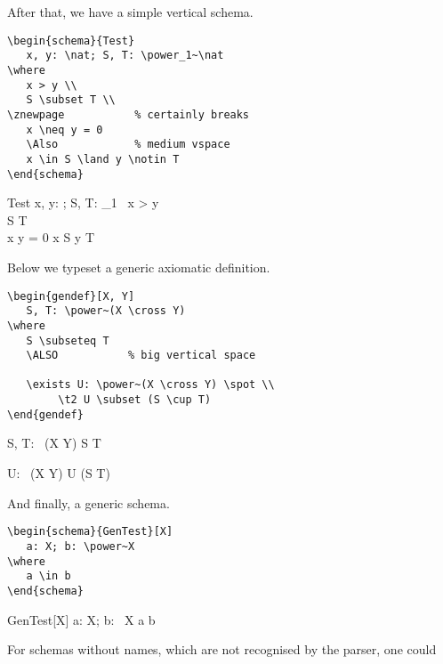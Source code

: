 \documentclass{article}
\def\gives{\endquote\endgroup\egroup}
\begin{document}
After that, we have a simple vertical schema.
%
\begin{demo}
\begin{verbatim}
\begin{schema}{Test}
   x, y: \nat; S, T: \power_1~\nat
\where
   x > y \\
   S \subset T \\
\znewpage           % certainly breaks
   x \neq y = 0
   \Also            % medium vspace
   x \in S \land y \notin T
\end{schema}
\end{verbatim}
\gives
\begin{schema}{Test}
   x, y: \nat; S, T: \power_1~\nat
\where
   x > y \\
   S \subset T \\
\znewpage           %
   x \neq y = 0
   \Also            %
   x \in S \land y \notin T
\end{schema}
\end{demo}
%
Below we typeset a generic axiomatic definition.
%
\begin{demo}
\begin{verbatim}
\begin{gendef}[X, Y]
   S, T: \power~(X \cross Y)
\where
   S \subseteq T
   \ALSO           % big vertical space

   \exists U: \power~(X \cross Y) \spot \\
        \t2 U \subset (S \cup T)
\end{gendef}
\end{verbatim}
\gives
\begin{gendef}[X, Y]
   S, T: \power~(X \cross Y)
\where
   S \subseteq T
   \ALSO           %

   \exists U: \power~(X \cross Y) \spot U \subset (S \cup T)
\end{gendef}
\end{demo}
%
And finally, a generic schema.
%
\begin{demo}
\begin{verbatim}
\begin{schema}{GenTest}[X]
   a: X; b: \power~X
\where
   a \in b
\end{schema}
\end{verbatim}
\gives
\begin{schema}{GenTest}[X]
   a: X; b: \power~X
\where
   a \in b
\end{schema}
\end{demo}
%
For schemas without names, which are not recognised by the parser, one could
\end{document}
